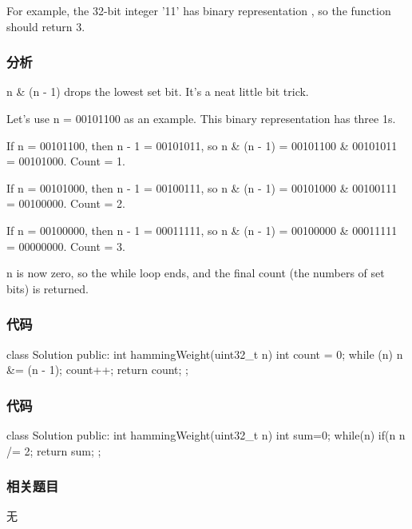 For example, the 32-bit integer ’11' has binary representation , so the function should return 3.

\subsubsection{分析}

n \& (n - 1) drops the lowest set bit. It's a neat little bit trick.

Let's use n = 00101100 as an example. This binary representation has three 1s.

If n = 00101100, then n - 1 = 00101011, so n \& (n - 1) = 00101100 \& 00101011 = 00101000. Count = 1.

If n = 00101000, then n - 1 = 00100111, so n \& (n - 1) = 00101000 \& 00100111 = 00100000. Count = 2.

If n = 00100000, then n - 1 = 00011111, so n \& (n - 1) = 00100000 \& 00011111 = 00000000. Count = 3.

n is now zero, so the while loop ends, and the final count (the numbers of set bits) is returned.

\subsubsection{代码}
\begin{Code}
class Solution {
public:
	int hammingWeight(uint32_t n) {
		int count = 0;
		while (n) {
			n &= (n - 1);
			count++;
		}
		return count;
	}
};
\end{Code}

\subsubsection{代码}
\begin{Code}
class Solution {
public:
    int hammingWeight(uint32_t n) {
        int sum=0;
        while(n) {
            if(n %
            n /= 2; 
        }
        return sum;
    }
};
\end{Code}

\subsubsection{相关题目}

\begindot
\item 无
\myenddot